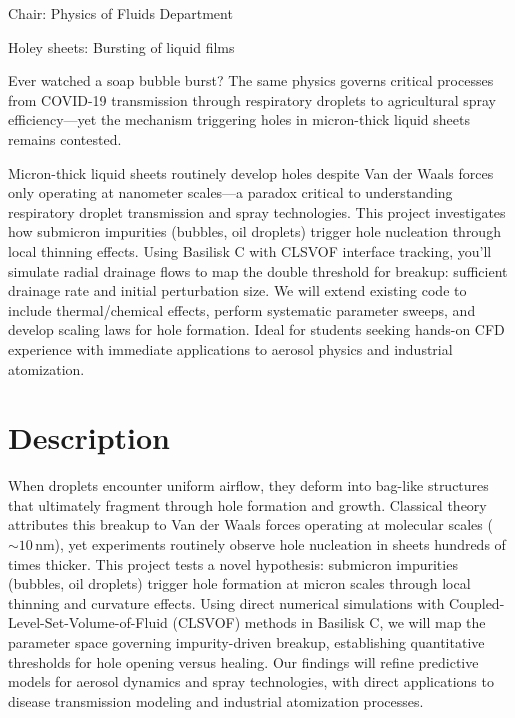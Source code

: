 \documentclass[a4paper,10pt]{article}
\begin{document}
 
\thispagestyle{empty} %

\noindent Chair: Physics of Fluids Department

\begin{center}
  \begin{LARGE}
   Holey sheets: Bursting of liquid films
  \end{LARGE}
\end{center}

\noindent Ever watched a soap bubble burst? The same physics governs critical processes from COVID-19 transmission through respiratory droplets to agricultural spray efficiency—yet the mechanism triggering holes in micron-thick liquid sheets remains contested.

\begin{tcolorbox}[colback=mgray,colframe=mpurple,title=TL;DR]
  Micron-thick liquid sheets routinely develop holes despite Van der Waals forces only operating at nanometer scales—a paradox critical to understanding respiratory droplet transmission and spray technologies. This project investigates how submicron impurities (bubbles, oil droplets) trigger hole nucleation through local thinning effects. Using Basilisk C with CLSVOF interface tracking, you'll simulate radial drainage flows to map the double threshold for breakup: sufficient drainage rate and initial perturbation size. We will extend existing code to include thermal/chemical effects, perform systematic parameter sweeps, and develop scaling laws for hole formation. Ideal for students seeking hands-on CFD experience with immediate applications to aerosol physics and industrial atomization.
\end{tcolorbox}

\section*{Description}

When droplets encounter uniform airflow, they deform into bag-like structures that ultimately fragment through hole formation and growth. Classical theory attributes this breakup to Van der Waals forces operating at molecular scales ($\sim 10\,\text{nm}$), yet experiments routinely observe hole nucleation in sheets hundreds of times thicker. 
This project tests a novel hypothesis: submicron impurities (bubbles, oil droplets) trigger hole formation at micron scales through local thinning and curvature effects. 
Using direct numerical simulations with Coupled-Level-Set-Volume-of-Fluid (CLSVOF) methods in Basilisk C, we will map the parameter space governing impurity-driven breakup, establishing quantitative thresholds for hole opening versus healing. Our findings will refine predictive models for aerosol dynamics and spray technologies, with direct applications to disease transmission modeling and industrial atomization processes.
\end{document}
